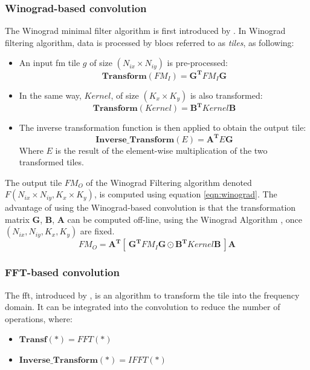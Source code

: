 \subsubsection{Winograd-based convolution}
%
The Winograd minimal filter algorithm is first introduced by \cite{winograd_arithmetic_1980}. In Winograd filtering algorithm, data is processed by blocs referred to as \textit{tiles}, as following:
\begin{itemize}
    \item An input \acrshort{fm} tile $g$ of size $(N_{ix} \times N_{iy})$ is pre-processed: $$\boldsymbol{Transform}(FM_I) = \boldsymbol{G^{T}} FM_I \boldsymbol{G} $$
    \item In the same way, $Kernel$, of size $(K_x \times K_y)$ is also transformed: $$\boldsymbol{Transform}(Kernel) = \boldsymbol{B^{T}} Kernel \boldsymbol{B}$$
    \item The inverse transformation function is then applied to obtain the output tile: $$\boldsymbol{Inverse\_Transform}(E) = \boldsymbol{A^{T}} E \boldsymbol{G}$$ Where $E$ is the result of the element-wise multiplication of the two transformed tiles.
\end{itemize}
The output tile $FM_O$ of the Winograd Filtering algorithm denoted $F(N_{ix} \times N_{iy}, K_x \times K_y)$, is computed using equation \ref{eqn:winograd}. The advantage of using the Winograd-based convolution is that the transformation matrix $\boldsymbol{G}$, $\boldsymbol{B}$, $\boldsymbol{A}$ can be computed off-line, using the Winograd Algorithm \cite{winograd_arithmetic_1980}, once $(N_{ix}, N_{iy}, K_x, K_y)$ are fixed.
\begin{equation}
\label{eqn:winograd}
FM_O = \boldsymbol{A^{T}} [ \ \boldsymbol{G^{T}} FM_I \boldsymbol{G} \odot \boldsymbol{B^{T}} Kernel \boldsymbol{B} \ ] \boldsymbol{A}
\end{equation}
%
\subsubsection{FFT-based convolution}
%
The \acrshort{fft}, introduced by \textcite{cooley_algorithm_1965}, is an algorithm to transform the tile into the frequency domain. It can be integrated into the convolution to reduce the number of operations, where:
\begin{itemize}
    \item $\boldsymbol{Transf(*)} = FFT(*)$
    \item $\boldsymbol{Inverse\_Transform(*)} = IFFT(*)$
\end{itemize}
%
